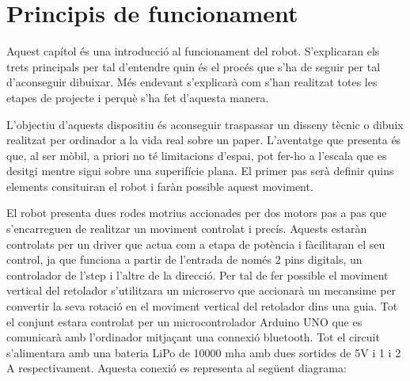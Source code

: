 \setlength\topmargin{8mm}
\onehalfspacing
\chapter{Principis de funcionament} %

\label{Chapter2} %






Aquest capítol és una introducció al funcionament del robot. S'explicaran els trets principals per tal d'entendre quin és el procés que s'ha de seguir per tal d'aconseguir dibuixar. Més endevant s'explicarà com s'han realitzat totes les etapes de projecte i perquè s'ha fet d'aquesta manera. 

L'objectiu d'aquests dispositiu és aconseguir traspassar un disseny tècnic o dibuix realitzat per ordinador a la vida real sobre un paper. L'aventatge que presenta és que, al ser mòbil, a priori no té limitacions d'espai, pot fer-ho a l'escala que es desitgi mentre sigui sobre una superifície plana. El primer pas serà definir quins elements consituiran el robot i faràn possible aquest moviment. 

El robot presenta dues rodes motrius accionades per dos motors pas a pas que s'encarreguen de realitzar un moviment controlat i precís. Aquests estaràn controlats per un driver que actua com a etapa de potència i fàcilitaran el seu control, ja que funciona a partir de l'entrada de només 2 pins digitals, un controlador de l'step i l'altre de la direcció. Per tal de fer possible el moviment vertical del retolador s'utilitzara un microservo que accionarà un mecansime per convertir la seva rotació en el moviment vertical del retolador dins una guia. Tot el conjunt estara controlat per un microcontrolador Arduino UNO que es comunicarà amb l'ordinador mitjaçant una connexió bluetooth. Tot el circuit s'alimentara amb una bateria LiPo de 10000 mha amb dues sortides de 5V i 1 i 2 A respectivament. Aquesta conexió es representa al següent diagrama:

